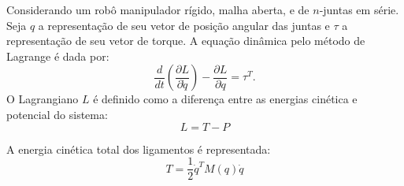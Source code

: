 Considerando um robô manipulador rígido, malha aberta, e de $n$-juntas em série. Seja $q$ a representação de seu vetor de posição angular das juntas  e $\tau$ a representação de seu vetor de torque. A equação dinâmica pelo método de
Lagrange é dada por:
\begin{equation} \label{eq:lagr1}
\frac{d}{dt}(\frac{\partial L}{\partial \dot{q}})-\frac{\partial L}{\partial q}=\tau^{T}.
\end{equation}
O Lagrangiano $L$ é definido como a diferença entre as energias cinética e potencial do sistema:
\begin{equation} \label{L}
L=T-P
\end{equation}

A energia cinética total dos ligamentos é representada:
\begin{equation} \label{energT}
T=\frac{1}{2}\dot{q}^{T}M(q)\dot{q}
\end{equation}
